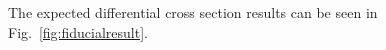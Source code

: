 %


The expected differential cross section results can be seen in Fig.~\ref{fig:fiducialresult}. 


